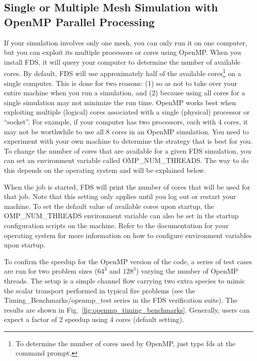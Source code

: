 \documentclass[11pt]{book}
\begin{document}
\subsection{Single or Multiple Mesh Simulation with OpenMP Parallel Processing}
\label{single_mesh}

If your simulation involves only one mesh, you can only run it on one computer, but you can exploit its multiple processors or cores using OpenMP. When you install FDS, it will query your computer to determine the number of available cores. By default, FDS will use approximately half of the available cores\footnote{To determine the number of cores used by OpenMP, just type {\ct fds} at the command prompt.} on a single computer. This is done for two reasons: (1) so as not to take over your entire machine when you run a simulation, and (2) because using all cores for a single simulation may not minimize the run time. OpenMP works best when exploiting multiple (logical) cores associated with a single (physical) processor or ``socket''.  For example, if your computer has two processors, each with 4 cores, it may not be worthwhile to use all 8 cores in an OpenMP simulation. You need to experiment with your own machine to determine the strategy that is best for you. To change the number of cores that are available for a given FDS simulation, you can set an environment variable called {\ct OMP\_NUM\_THREADS}. The way to do this depends on the operating system and will be explained below.

When the job is started, FDS will print the number of cores that will be used for that job. Note that this setting only applies until you log out or restart your machine. To set the default value of available cores upon startup, the {\ct OMP\_NUM\_THREADS} environment variable can also be set in the startup configuration scripts on the machine. Refer to the documentation for your operating system for more information on how to configure environment variables upon startup.

To confirm the speedup for the OpenMP version of the code, a series of test cases are run for two problem sizes ($64^3$ and $128^3$) varying the number of OpenMP threads.  The setup is a simple channel flow carrying two extra species to mimic the scalar transport performed in typical fire problems (see the {\ct Timing\_Benchmarks/openmp\_test} series in the FDS verification suite).  The results are shown in Fig.~\ref{fig:openmp_timing_benchmarks}.  Generally, users can expect a factor of 2 speedup using 4 cores (default setting).
\end{document}
